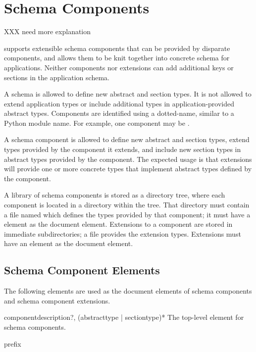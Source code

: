 \documentclass{howto}
\newcommand{\datatype}[1]{\strong{#1}}
\begin{document}
\section{Schema Components \label{schema-components}}

XXX need more explanation

 supports extensible schema components that can be
provided by disparate components, and allows them to be knit together
into concrete schema for applications.  Neither components nor
extensions can add additional keys or sections in the application
schema.

A schema  is allowed to define new abstract and
section types.  It is not allowed to extend application types or
include additional types in application-provided abstract types.
Components are identified using a dotted-name, similar to a Python
module name.  For example, one component may be .

A schema component  is allowed to define new abstract
and section types, extend types provided by the component it extends,
and include new section types in abstract types provided by the
component.  The expected usage is that extensions will provide one or
more concrete types that implement abstract types defined by the
component.

A library of schema components is stored as a directory tree, where
each component is located in a directory within the tree.  That
directory must contain a file named  which defines
the types provided by that component; it must have a
 element as the document element.  Extensions to a
component are stored in immediate subdirectories; a file
 provides the extension types.  Extensions must
have an  element as the document element.


\subsection{Schema Component Elements \label{component-elements}}

The following elements are used as the document elements of schema
components and schema component extensions.

\begin{elementdesc}{component}{description?, (abstracttype | sectiontype)*}
  The top-level element for schema components.

  \begin{attributedesc}{prefix}{\datatype{dotted-name}}
  \end{attributedesc}
\end{elementdesc}
\end{document}
